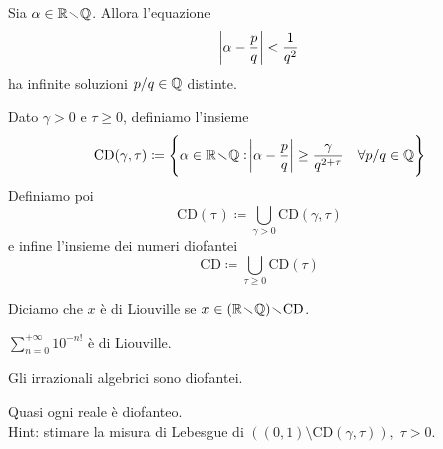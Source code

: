 \begin{exercise}
    Sia $ \alpha \in \mathbb{R}\!\smallsetminus\!\mathbb{Q} $. Allora l'equazione
    \[ \abs{\alpha - \frac{p}{q}} < \frac{1}{q^2} \]
    ha infinite soluzioni $ p/q \in\mathbb{Q} $ distinte.
\end{exercise}

\begin{definition}
    Dato $ \gamma > 0 $ e $ \tau \geq 0 $, definiamo l'insieme
    \[ \mathrm{CD(\gamma,\tau)} \coloneqq \left\{ \alpha\in\mathbb{R}\!\smallsetminus\!\mathbb{Q} : \abs{\alpha - \frac{p}{q}} \geq \frac{\gamma}{q^{2+\tau}}\quad \forall p/q\in\mathbb{Q} \right\} \]
    Definiamo poi
    \[ \mathrm{CD(\tau)} \coloneqq \bigcup_{\gamma > 0} \mathrm{CD}(\gamma,\tau) \]
    e infine l'insieme dei numeri diofantei
    \[ \mathrm{CD} \coloneqq \bigcup_{\tau \geq 0} \mathrm{CD}(\tau) \]
\end{definition}

\begin{definition}
    Diciamo che $ x $ è di Liouville se $ x\in (\mathbb{R}\!\smallsetminus\!\mathbb{Q}) \!\smallsetminus\! \mathrm{CD} $.
\end{definition}

\begin{exercise}
    $ \sum_{n=0}^{+\infty} 10^{-n!} $ è di Liouville.
\end{exercise}
\begin{exercise}
    Gli irrazionali algebrici sono diofantei.
\end{exercise}
\begin{exercise}
    Quasi ogni reale è diofanteo.\\
    Hint: stimare la misura di Lebesgue di $ ( (0,1) \setminus \mathrm{CD}(\gamma,\tau) ),\; \tau > 0 $.
\end{exercise}
